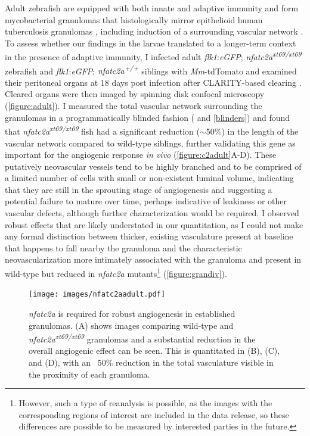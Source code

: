 Adult zebrafish are equipped with both innate and adaptive immunity and form mycobacterial granulomas that histologically mirror epithelioid human tuberculosis granulomas \citep{Swaim2006}, including induction of a surrounding vascular network \citep{Cronan2015}. To assess whether our findings in the larvae translated to a longer\hyp{}term context in the presence of adaptive immunity, I infected adult \textit{flk1}:\textit{eGFP}; \textit{nfatc2a\textsuperscript{xt69/xt69}} zebrafish and \textit{flk1}:\textit{eGFP}; \textit{nfatc2a\textsuperscript{+/+}} siblings with \textit{Mm}\hyp{}tdTomato and examined their peritoneal organs at 18 days post infection after CLARITY\hyp{}based clearing \citep{Chung2013, Cronan2015}. Cleared organs were then imaged by spinning disk confocal microscopy (\autoref{figure:adult}). I measured the total vascular network surrounding the granulomas in a programmatically blinded fashion (\citet{Salter2016} and \autoref{blinders}) and found that \textit{nfatc2a\textsuperscript{xt69/xt69}} fish had a significant reduction (${\sim}$50\%) in the length of the vascular network compared to wild\hyp{}type siblings, further validating this gene as important for the angiogenic response \textit{in vivo} (\autoref{figure:c2adult}A\hyp{}D). These putatively neovascular vessels tend to be highly branched and to be comprised of a limited number of cells with small or non\hyp{}existent luminal volume, indicating that they are still in the sprouting stage of angiogenesis and suggesting a potential failure to mature over time, perhaps indicative of leakiness or other vascular defects, although further characterization would be required. I observed robust effects that are likely understated in our quantitation, as I could not make any formal distinction between thicker, existing vasculature present at baseline that happens to fall nearby the granuloma and the characteristic neovascularization more intimately associated with the granuloma and present in wild\hyp{}type but reduced in \textit{nfatc2a} mutants\footnote{However, such a type of reanalysis is possible, as the images with the corresponding regions of interest are included in the data release, so these differences are possible to be measured by interested parties in the future.} (\autoref{figure:grandiv}).

\begin{figure}
\centering
\texttt{[image: images/nfatc2aadult.pdf]}
\caption[\textit{nfatc2a} is necessary for angiogenesis in adult granulomas]{\textit{nfatc2a} is required for robust angiogenesis in established granulomas. (A) shows images comparing wild\hyp{}type and \textit{nfatc2a\textsuperscript{xt69/xt69}} granulomas and a substantial reduction in the overall angiogenic effect can be seen. This is quantitated in (B), (C), and (D), with an ~50\% reduction in the total vasculature visible in the proximity of each granuloma.}
\label{figure:c2adult}
\end{figure}

